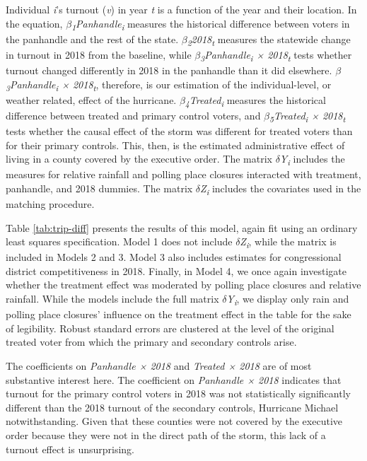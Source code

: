 \documentclass[
  12pt,
]{article}
\begin{document}
Individual \emph{i}'s turnout (\emph{v}) in year \emph{t} is a function of the year and their location. In the equation, \emph{\(\beta\)\textsubscript{1}Panhandle\textsubscript{i}} measures the historical difference between voters in the panhandle and the rest of the state. \emph{\(\beta\)\textsubscript{2}2018\textsubscript{t}} measures the statewide change in turnout in 2018 from the baseline, while \emph{\(\beta\)\textsubscript{3}Panhandle\textsubscript{i} × 2018\textsubscript{t}} tests whether turnout changed differently in 2018 in the panhandle than it did elsewhere. \emph{\(\beta\)\textsubscript{3}Panhandle\textsubscript{i} × 2018\textsubscript{t}}, therefore, is our estimation of the individual-level, or weather related, effect of the hurricane. \emph{\(\beta\)\textsubscript{4}Treated\textsubscript{i}} measures the historical difference between treated and primary control voters, and \emph{\(\beta\)\textsubscript{5}Treated\textsubscript{i} × 2018\textsubscript{t}} tests whether the causal effect of the storm was different for treated voters than for their primary controls. This, then, is the estimated administrative effect of living in a county covered by the executive order. The matrix \emph{\(\delta\)Y\textsubscript{i}} includes the measures for relative rainfall and polling place closures interacted with treatment, panhandle, and 2018 dummies. The matrix \emph{\(\delta\)Z\textsubscript{i}} includes the covariates used in the matching procedure.

Table \ref{tab:trip-diff} presents the results of this model, again fit using an ordinary least squares specification. Model 1 does not include \emph{\(\delta\)Z\textsubscript{i}}, while the matrix is included in Models 2 and 3. Model 3 also includes estimates for congressional district competitiveness in 2018. Finally, in Model 4, we once again investigate whether the treatment effect was moderated by polling place closures and relative rainfall. While the models include the full matrix \emph{\(\delta\)Y\textsubscript{i}}, we display only rain and polling place closures' influence on the treatment effect in the table for the sake of legibility. Robust standard errors are clustered at the level of the original treated voter from which the primary and secondary controls arise.

\begin{singlespace}


\end{singlespace}

The coefficients on \emph{Panhandle × 2018} and \emph{Treated × 2018} are of most substantive interest here. The coefficient on \emph{Panhandle × 2018} indicates that turnout for the primary control voters in 2018 was not statistically significantly different than the 2018 turnout of the secondary controls, Hurricane Michael notwithstanding. Given that these counties were not covered by the executive order because they were not in the direct path of the storm, this lack of a turnout effect is unsurprising.
\end{document}
